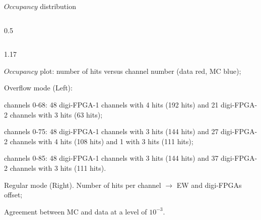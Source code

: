 \documentclass{beamer}
\begin{document}
\begin{frame}{$Occupancy$ distribution}
\begin{columns}
\begin{column}{0.5 \framewidth}
\begin{figure}[h!]
\end{figure} 
    \end{column}
\end{columns}      
 \begin{columns}
    \begin{column}{1.17\framewidth}
        \setlength{\leftmargini}{1.2em}
     \begin{itemize}
     {\footnotesize
      \item $Occupancy$ plot: number of hits versus channel number (data red, MC blue);
    \item Overflow mode (Left):   }
    \begin{itemize}
    {\footnotesize
        \item channels 0-68: 48 digi-FPGA-1 channels with 4 hits (192 hits) and 21 digi-FPGA-2 channels with 3 hits (63 hits);
        \item channels 0-75: 48 digi-FPGA-1 channels with 3 hits (144 hits) and 27 digi-FPGA-2 channels with 4 hits (108 hits) and 1 with 3 hits (111 hits);
        \item channels 0-85: 48 digi-FPGA-1 channels with 3 hits (144 hits) and 37 digi-FPGA-2 channels with 3 hits (111 hits).}
    \end{itemize}
    {\footnotesize \item  Regular mode (Right). Number of hits per channel $\rightarrow$ EW and digi-FPGAs offset;
        \vspace{-0.5mm}
    \item Agreement between MC and data at a level of $10^{-3}$.
    }
   
        \end{itemize}
             \end{column}
\end{columns}     
\end{frame}
\end{document}
